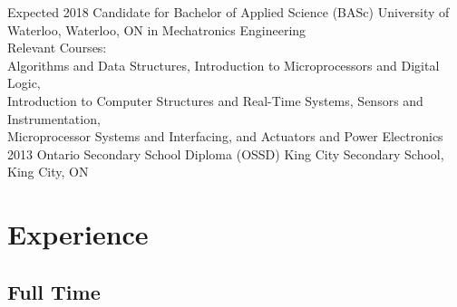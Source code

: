 \documentclass[hidelinks]{kkurucz-cv}
\begin{document}
\begin{entrylist}
\entry
{Expected 2018}
{Candidate for Bachelor of Applied Science (BASc)}
{University of Waterloo, Waterloo, ON}
{{\headingfont in Mechatronics Engineering}}
{\\Relevant Courses:
\\Algorithms and Data Structures, Introduction to Microprocessors and Digital Logic,
\\Introduction to Computer Structures and Real-Time Systems, Sensors and Instrumentation,
\\Microprocessor Systems and Interfacing, and Actuators and Power Electronics}
\entry
{2013}
{Ontario Secondary School Diploma (OSSD)}
{King City Secondary School, King City, ON}
{\null}
{\null}
\end{entrylist}

\vspace{-2mm}
\section{Experience}

\subsection{Full Time}
\end{document}
